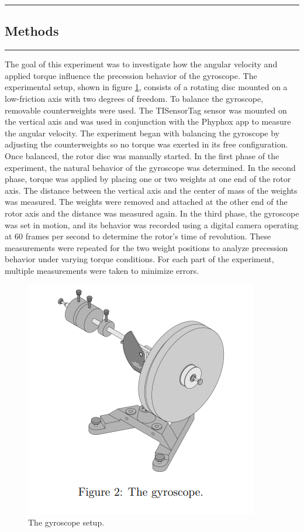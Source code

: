 {\color{gray}\hrule}
\begin{center}
\section{Methods} \label{sec:methods}
\end{center}
{\color{gray}\hrule}

\begin{multicols}{2}
The goal of this experiment was to investigate how the angular velocity and applied torque influence the precession behavior of the gyroscope. The experimental setup, shown in figure \ref{fig:methods:setup}, consists of a rotating disc mounted on a low-friction axis with two degrees of freedom. To balance the gyroscope, removable counterweights were used. The TISensorTag sensor was mounted on the vertical axis and was used in conjunction with the Phyphox app to measure the angular velocity.
The experiment began with balancing the gyroscope by adjusting the counterweights so no torque was exerted in its free configuration. Once balanced, the rotor disc was manually started. In the first phase of the experiment, the natural behavior of the gyroscope was determined.
In the second phase, torque was applied by placing one or two weights at one end of the rotor axis. The distance between the vertical axis and the center of mass of the weights was measured. The weights were removed and attached at the other end of the rotor axis and the distance was measured again. 
In the third phase, the gyroscope was set in motion, and its behavior was recorded using a digital camera operating at $60$ frames per second to determine the rotor’s time of revolution. These measurements were repeated for the two weight positions to analyze precession behavior under varying torque conditions.
For each part of the experiment, multiple measurements were taken to minimize errors.

\end{multicols}

\begin{figure}[H]
    \centering
    \includegraphics[width=0.5\columnwidth, angle=90]{gyroscope/images/setup}
    \caption{The gyroscope setup.}
    \label{fig:methods:setup}
\end{figure}
